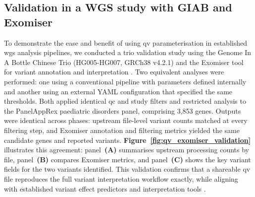 \subsection{Validation in a WGS study with GIAB and Exomiser}

To demonstrate the ease and benefit of using \ac{qv} parameterisation in established \ac{wgs} analysis pipelines, we conducted a trio validation study using the Genome In A Bottle Chinese Trio (HG005-HG007, GRCh38 v4.2.1) and the Exomiser tool for variant annotation and interpretation \cite{2020ciprianiImprovedPhenotypeDrivenTool}. 
Two equivalent analyses were performed: one using a conventional pipeline with parameters defined internally and another using an external YAML configuration that specified the same thresholds. 
Both applied identical \ac{qc} and study filters and restricted analysis to the PanelAppRex paediatric disorders panel, comprising 3{,}853 genes. 
Outputs were identical across phases: upstream file-level variant counts matched at every filtering step, and Exomiser annotation and filtering metrics yielded the same candidate genes and reported variants. 
\textbf{Figure~\ref{fig:qv_exomiser_validation}} illustrates this agreement: panel~\textbf{(A)} summarises upstream processing counts by file, panel~\textbf{(B)} compares Exomiser metrics, and panel~\textbf{(C)} shows the key variant fields for the two variants identified. 
This validation confirms that a shareable \ac{qv} file reproduces the full variant interpretation workflow exactly, while aligning with established variant effect predictors and interpretation tools \cite{2024riccioVariantEffectPredictors, 2020ciprianiImprovedPhenotypeDrivenTool, 2020holtgreweVarFishComprehensiveDNA}.

